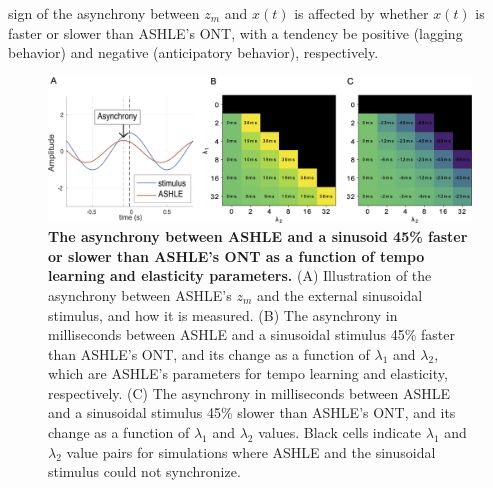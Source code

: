 \documentclass{report}
\begin{document}
sign of the asynchrony between $z_m$ and $x(t)$ is affected by whether $x(t)$ is faster or slower than ASHLE's ONT, with a tendency be positive (lagging behavior) and negative (anticipatory behavior), respectively.

\begin{figure}
    \centering
    \includegraphics[width=1.0\textwidth]{figures/fig3_6.png}
    \caption[The asynchrony between ASHLE and a sinusoid 45\% faster or slower than ASHLE's ONT as a function of tempo learning and elasticity parameters]{\textbf{The asynchrony between ASHLE and a sinusoid 45\% faster or slower than ASHLE's ONT as a function of tempo learning and elasticity parameters.} (A) Illustration of the asynchrony between ASHLE's $z_m$ and the external sinusoidal stimulus, and how it is measured. (B) The asynchrony in milliseconds between ASHLE and a sinusoidal stimulus 45\% faster than ASHLE's ONT, and its change as a function of $\lambda_1$ and $\lambda_2$, which are ASHLE's parameters for tempo learning and elasticity, respectively. (C) The asynchrony in milliseconds between ASHLE and a sinusoidal stimulus 45\% slower than ASHLE's ONT, and its change as a function of $\lambda_1$ and $\lambda_2$ values. Black cells indicate $\lambda_1$ and $\lambda_2$ value pairs for simulations where ASHLE and the sinusoidal stimulus could not synchronize.}
    \label{f3_6}
\end{figure}
\end{document}

